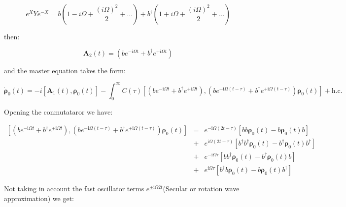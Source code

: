 \documentclass[%
preprint,
onecolumn,
notitlepag,
 amsmath,amssymb,
 aps,
 pra,
]{revtex4-2}
\begin{document}
\begin{itemize}
\begin{equation}
\left.e^{X} Y e^{-X}= b \left( 1- i \Omega + \frac{(i\Omega )^2}{2} + \dots \right) + b^{\dagger} \left( 1+ i \Omega+ \frac{(i\Omega )^2}{2} + \dots \right)
\end{equation}

 then:


\begin{equation}\boldsymbol{A}_2(t)=\left(b e^{-\mathrm{i} \Omega t}+b^{\dagger} e^{+\mathrm{i} \Omega t}\right)\end{equation}

and the master equation takes the form:

\begin{equation}
\dot{\boldsymbol{\rho}}_0(t)=-i \left[ \boldsymbol{A}_1(t) , \boldsymbol{\rho}_0(t) \right]  -\int_{0}^{\infty} C(\tau)\left[\left(b e^{-\mathrm{i} \Omega t}+b^{\dagger} e^{+\mathrm{i} \Omega t}\right),\left(b e^{-\mathrm{i} \Omega(t-\tau)}+b^{\dagger} e^{+\mathrm{i} \Omega(t-\tau)}\right) \boldsymbol{\rho}_{\mathrm{0}}(t) \right]+\mathrm{h.c.}\end{equation}

Opening the conmutataror we have:

\begin{equation} 
\begin{align}
    \left[\left(b e^{-\mathrm{i} \Omega t}+b^{\dagger} e^{+\mathrm{i} \Omega t}\right),\left(b e^{-\mathrm{i} \Omega(t-\tau)}+b^{\dagger} e^{+\mathrm{i} \Omega(t-\tau)}\right) \boldsymbol{\rho}_{\mathrm{0}}(t) \right] &=& e^{-\mathrm{i} \Omega (2t - \tau)} \left[ bb \boldsymbol{\rho}_{\mathrm{0}}(t) -b \boldsymbol{\rho}_{\mathrm{0}}(t)  b \right] \\
    &+&  e^{\mathrm{i} \Omega (2t - \tau)} \left[ b^{\dagger}b ^{\dagger} \boldsymbol{\rho}_{\mathrm{0}}(t) -b ^{\dagger} \boldsymbol{\rho}_{\mathrm{0}}(t)  b ^{\dagger} \right] \\
    &+& e^{- \mathrm{i} \Omega \tau} \left[ b b ^{\dagger} \boldsymbol{\rho}_{\mathrm{0}}(t) -b ^{\dagger} \boldsymbol{\rho}_{\mathrm{0}}(t)  b  \right] \\
    &+& e^{\mathrm{i} \Omega   \tau} \left[ b^{\dagger}b \boldsymbol{\rho}_{\mathrm{0}}(t) -b  \boldsymbol{\rho}_{\mathrm{0}}(t)  b ^{\dagger} \right] 
\end{align}
\end{equation}

Not taking in account the fast oscillator terms $e^{\pm  \mathrm{i} \Omega 2t }$(Secular or rotation wave approximation) we get: 


\end{itemize}
\end{document}
